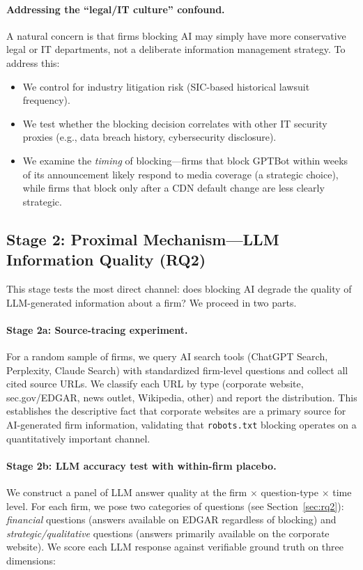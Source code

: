 \documentclass[12pt,a4paper]{article}
\begin{document}
\paragraph{Addressing the ``legal/IT culture'' confound.} A natural concern is that firms blocking AI may simply have more conservative legal or IT departments, not a deliberate information management strategy. To address this:
\begin{itemize}
    \item We control for industry litigation risk (SIC-based historical lawsuit frequency).
    \item We test whether the blocking decision correlates with other IT security proxies (e.g., data breach history, cybersecurity disclosure).
    \item We examine the \emph{timing} of blocking---firms that block GPTBot within weeks of its announcement likely respond to media coverage (a strategic choice), while firms that block only after a CDN default change are less clearly strategic.
\end{itemize}

\subsection{Stage 2: Proximal Mechanism---LLM Information Quality (RQ2)}

This stage tests the most direct channel: does blocking AI degrade the quality of LLM-generated information about a firm? We proceed in two parts.

\paragraph{Stage 2a: Source-tracing experiment.} For a random sample of firms, we query AI search tools (ChatGPT Search, Perplexity, Claude Search) with standardized firm-level questions and collect all cited source URLs. We classify each URL by type (corporate website, sec.gov/EDGAR, news outlet, Wikipedia, other) and report the distribution. This establishes the descriptive fact that corporate websites are a primary source for AI-generated firm information, validating that \texttt{robots.txt} blocking operates on a quantitatively important channel.

\paragraph{Stage 2b: LLM accuracy test with within-firm placebo.} We construct a panel of LLM answer quality at the firm $\times$ question-type $\times$ time level. For each firm, we pose two categories of questions (see Section~\ref{sec:rq2}): \emph{financial} questions (answers available on EDGAR regardless of blocking) and \emph{strategic/qualitative} questions (answers primarily available on the corporate website). We score each LLM response against verifiable ground truth on three dimensions:
\end{document}
